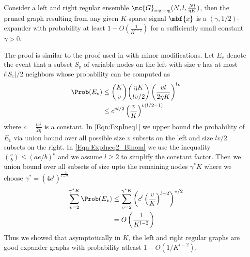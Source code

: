 \documentclass[conference]{IEEEtran}
\begin{document}
\begin{lemma}\label{Lem:ExpGraph}
Consider a left and right regular ensemble $\mc{G}_{\text{reg-reg}}(N,l,\frac{Nl}{\eta K})$, then the pruned graph resulting from any given $K$-sparse signal $\mbf{x}$ is a $(\gamma,1/2)$-expander with probability at least $1-O\left(\frac{1}{K^{l-2}}\right)$ for a sufficiently small constant $\gamma >0$.
\end{lemma}
\begin{IEEEproof}
The proof is similar to the proof used in \cite{li2015subdraft} with minor modifications. Let $E_{v}$ denote the event that a subset $S_{v}$ of variable nodes on the left with size $v$ has at most $l|S_v|/2$ neighbors whose probability can be computed as
\begin{align}
\Prob(E_v)&\leq \binom{K}{v}\binom{\eta K}{lv/2}\left(\frac{vl}{2\eta K}\right)^{lv}\label{Eqn:ExpIneq1}\\
				&\leq c^{vl/2}\left(\frac{v}{K}\right)^{v(l/2-1)}\label{Eqn:ExpIneq2_Binom}
\end{align}
where $c=\frac{le^{2}}{2\eta}$ is a constant. In \eqref{Eqn:ExpIneq1} we upper bound the probability of $E_v$ via union bound over all possible size $v$ subsets on the left and size $lv/2$ subsets on the right. In \eqref{Eqn:ExpIneq2_Binom} we use the inequality $\binom{a}{b}\leq \left(ae/b\right)^b$ and we assume $l\geq 2$ to simplify the constant factor. Then we union bound over all subsets of size upto the remaining nodes $\gamma^{*} K$ where we choose $\gamma^{*}=\left(4c^l\right)^{\frac{-1}{l-2}}$
\begin{align*}
\sum_{v=2}^{\gamma^{*} K}\Prob(E_{v})&\leq \sum_{v=2}^{\gamma^{*} K}\left(c^{l}\left(\frac{v}{K}\right)^{l-2}\right)^{v/2}\\
														&=O\left(\frac{1}{K^{l-2}}\right)
\end{align*}
Thus we showed that asymptotically in $K$, the left and right regular graphs are good expander graphs with probability atleast $1-O(1/K^{l-2}).$
\end{IEEEproof}
\vspace{1ex}
\end{document}

